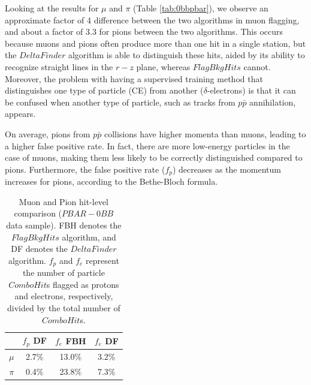       Looking at the results for $\mu$ and $\pi$ (Table \ref{tab:0bbpbar}), 
      we observe an approximate factor of 4 difference between the two algorithms 
      in muon flagging, and about a factor of 3.3 for pions 
      between the two algorithms. This occurs 
      because muons and pions often produce more than one hit in a single station, 
      but the $DeltaFinder$ algorithm is able to distinguish these hits, aided by 
      its ability to recognize straight lines in the $r-z$ plane, whereas 
      $FlagBkgHits$ cannot. Moreover, the problem with having a supervised 
      training method that distinguishes one type of particle (CE) from another ($\delta$-electrons)
      is that it can be confused when another type of particle, such as 
      tracks from $p\bar{p}$ annihilation, appears. 
      
      On average, pions from $p\bar{p}$ collisions have higher 
      momenta than muons, leading to a higher false positive rate. In fact, 
      there are more low-energy particles in the case of muons, making them 
      less likely to be correctly distinguished compared to pions. Furthermore, 
      the false positive rate ($f_p$) decreases as the momentum increases for pions, 
      according to the Bethe-Bloch formula.

    \begin{center}
        \begin{table}[h!]
        \centering
        \renewcommand{\arraystretch}{1.}
        \begin{tabular}{| c | c | c | c|} 
        \hline
         &  $f_{p}$ DF &  $f_{e}$ FBH & $f_{e}$ DF\\
        \hline
        $\mu$  &  2.7\%  & 13.0\% & 3.2\%\\
        \hline
        $\pi$ & 0.4\% & 23.8\%& 7.3\%\\
        \hline
        \end{tabular}
        \caption[Muon and Pion hit-level comparison.]{Muon and Pion 
        hit-level comparison ($PBAR-0BB$ data sample). FBH denotes 
        the $FlagBkgHits$ algorithm, and DF denotes the $DeltaFinder$ algorithm. $f_p$ and $f_e$ represent 
        the number of particle $ComboHit$s flagged as protons and electrons, respectively, 
        divided by the total number of $ComboHit$s.}
        \end{table}\label{tab:0bbpbar}
        \end{center}


